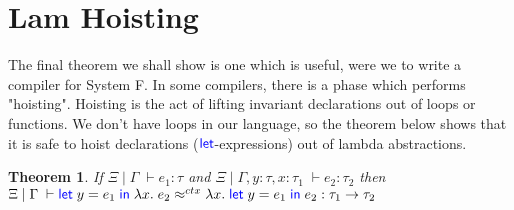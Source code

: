 \documentclass[twoside,11pt,openright]{report}
\newtheorem{theorem}{Theorem}
\theoremstyle{definition}
\newcommand{\Keyword}[1]{{\color{blue} \mathsf{#1}}}
\newcommand{\var}{x}
\newcommand{\varB}{y}
\newcommand{\expr}{e}
\newcommand{\LetCmd}{\Keyword{let}}
\newcommand{\Tfunc}[2]{#1 \rightarrow #2}
\newcommand{\typ}{\tau}
\newcommand{\venv}{\Gamma}
\newcommand{\tenv}{\Xi}
\newcommand{\jdg}[4]{#1 \; | \; #2 \; \vdash #3 : #4}
\newcommand{\jdgRel}[6]{#1 \; | \; #2 \; \vdash #3 \approx^{#4} #5 : #6}
\newcommand{\ctxRel}[5]{\jdgRel{#1}{#2}{#3}{ctx}{#4}{#5}}
\begin{document}
\section{Lam Hoisting}
The final theorem we shall show is one which is useful, were we to write a compiler for System F. In some compilers, there is a phase which performs "hoisting". Hoisting is the act of lifting invariant declarations out of loops or functions. We don't have loops in our language, so the theorem below shows that it is safe to hoist declarations ($\LetCmd$-expressions) out of lambda abstractions.
\begin{theorem}
  If $\jdg{\tenv}{\venv}{\expr_1}{\typ}$ and $\jdg{\tenv}{\venv, \varB : \typ, \var : \typ_1}{\expr_2}{\typ_2}$ then\\
  $\ctxRel{\tenv}{\venv}{\Let \varB = \expr_1 in \fun \var . \expr_2}{\fun \var . \Let \varB = \expr_1 in \expr_2}{\Tfunc{\typ_1}{\typ_2}}$
\end{theorem}
\end{document}
